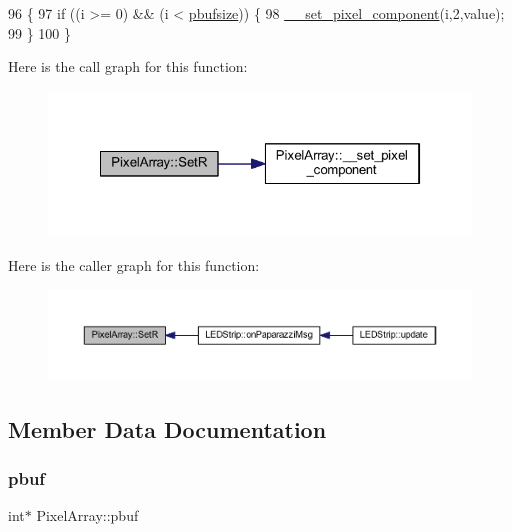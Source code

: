 \begin{DoxyCode}
96 \{
97     \textcolor{keywordflow}{if} ((i >= 0) && (i < \hyperlink{class_pixel_array_aca29e70f9b643bff3733ab2e694439a1}{pbufsize})) \{
98         \hyperlink{class_pixel_array_a42c6681bf771332826ecc9ad2a8cea02}{\_\_set\_pixel\_component}(i,2,value);
99     \}
100 \}
\end{DoxyCode}
Here is the call graph for this function\+:\nopagebreak
\begin{figure}[H]
\begin{center}
\leavevmode
\includegraphics[width=322pt]{class_pixel_array_abd4253e7c76f3775f31e09dfe318e3a5_cgraph}
\end{center}
\end{figure}
Here is the caller graph for this function\+:\nopagebreak
\begin{figure}[H]
\begin{center}
\leavevmode
\includegraphics[width=350pt]{class_pixel_array_abd4253e7c76f3775f31e09dfe318e3a5_icgraph}
\end{center}
\end{figure}


\subsection{Member Data Documentation}
\mbox{\label{class_pixel_array_ab0109a336e69a9942b2723e43ee715d7}} 
\subsubsection{\texorpdfstring{pbuf}{pbuf}}
{\footnotesize\ttfamily int$\ast$ Pixel\+Array\+::pbuf\hspace{0.3cm}{\ttfamily [private]}}



